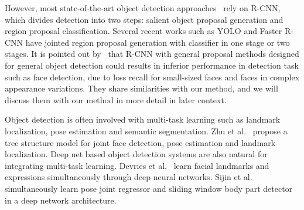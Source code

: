 However, most state-of-the-art object detection approaches~\cite{ouyang2014deepid, li2015convolutional, erhan2014scalable,girshick2015fast} rely on R-CNN, which divides detection into two steps: salient object proposal generation and region proposal classification. Several recent works such as YOLO and Faster R-CNN have jointed region proposal generation with classifier in one stage or two stages. It is pointed out by~\cite{farfade2015multi} that R-CNN with general proposal methods designed for general object detection could results in inferior performance in detection task such as face detection, due to loss recall for small-sized faces and faces in complex appearance variations. They share similarities with our method, and we will discuss them with our method in more detail in later context.  

Object detection is often involved with multi-task learning such as landmark localization, pose estimation and semantic segmentation. Zhu et al.~\cite{zhu2012face} propose a tree structure model for joint face detection, pose estimation and landmark localization. Deep net based object detection systems are also natural for integrating multi-task learning. Devries et al.~\cite{devries2014multi} learn facial landmarks and expressions simultaneously through deep neural networks. Sijin et al.~\cite{li2014heterogeneous} simultaneously learn pose joint regressor and sliding window body part detector in a deep network architecture. 
